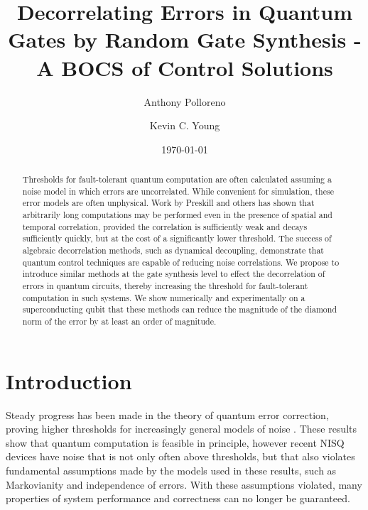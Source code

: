 \documentclass[aps,nofootinbib,pra,notitlepage,twocolumn]{revtex4-1}
\begin{document}
\title{Decorrelating Errors in Quantum Gates by Random Gate Synthesis - A BOCS of Control Solutions}

\author{Anthony Polloreno}

\author{Kevin C. Young}

\date{\today}

\begin{abstract}
Thresholds for fault-tolerant quantum computation are often calculated assuming a noise model in which errors are uncorrelated. While convenient for simulation, these error models are often unphysical. Work by Preskill and others has shown that arbitrarily long computations may be performed even in the presence of spatial and temporal correlation, provided the correlation is sufficiently weak and decays sufficiently quickly, but at the cost of a significantly lower threshold. The success of algebraic decorrelation methods, such as dynamical decoupling, demonstrate that quantum control techniques are capable of reducing noise correlations. We propose to introduce similar methods at the gate synthesis level to effect the decorrelation of errors in quantum circuits, thereby increasing the threshold for fault-tolerant computation in such systems. We show numerically and experimentally on a superconducting qubit that these methods can reduce the magnitude of the diamond norm of the error by at least an order of magnitude.
\end{abstract}

\pacs{}

\maketitle

\section{Introduction}

Steady progress has been made in the theory of quantum error correction, proving higher thresholds for increasingly general models of noise \cite{Aharonov2006, 1609.00510, https://doi.org/10.7907/z96m34sc, Kubica2018, Wang2003, Campbell2017}. These results show that quantum computation is feasible in principle, however recent NISQ \cite{Preskill2018} devices have noise that is not only often above thresholds, but that also violates fundamental assumptions made by the models used in these results, such as Markovianity \cite{Kitaev1997} and independence of errors\cite{Knill1998}. With these assumptions violated, many properties of system performance and correctness can no longer be guaranteed.
\end{document}
